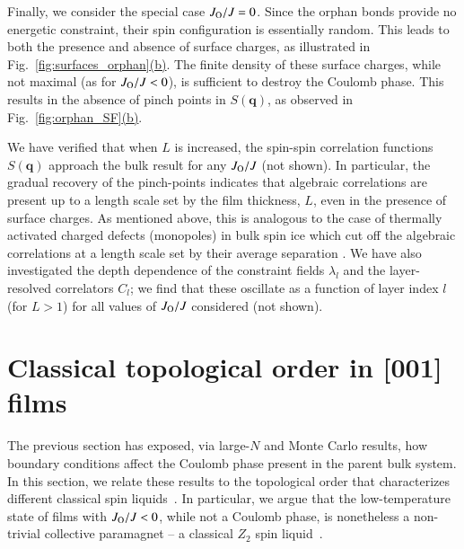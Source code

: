 \documentclass[aps,prx,reprint,runinaddress,superscriptaddress,amsmath,amssymb,floatfix,longbibliography]{revtex4-1}
\renewcommand{\vec}[1]{\boldsymbol{#1}}
\newcommand{\Jo}{J_{\rm O}}
\newcommand{\subref}[2]{\ref{#1}\hyperref[#1]{#2}}
\begin{document}
Finally, we consider the special case $\Jo/J = 0$. Since the orphan bonds provide no energetic constraint, their spin configuration is essentially random.  This leads to both the presence and absence of surface charges, as illustrated in Fig.~\subref{fig:surfaces_orphan}{(b)}. The finite density of these surface charges, while not maximal (as for $\Jo/J<0$), is sufficient to destroy the Coulomb phase. This results in the absence of pinch points in $S(\vec{q})$, as observed in Fig.~\subref{fig:orphan_SF}{(b)}.

We have verified that when $L$ is increased, the spin-spin correlation functions $S(\vec{q})$ approach the bulk result for any $\Jo/J$ (not shown). In particular, the gradual recovery of the pinch-points indicates that algebraic correlations are present up to a length scale set by the film thickness, $L$, even in the presence of surface charges. As mentioned above, this is analogous to the case of thermally activated charged defects (monopoles) in bulk spin ice which cut off the algebraic correlations at a length scale set by their average separation \cite{Castelnovo2011}. We have also investigated the depth dependence of the constraint fields $\lambda_l$ and the layer-resolved correlators $C_l$; we find that these oscillate as a function of layer index $l$ (for $L > 1$) for all values of $\Jo/J$ considered (not shown).

\section{Classical topological order in [001] films}
\label{sec:topological}

The previous section has exposed, via large-$N$ and Monte Carlo results, how boundary conditions affect the Coulomb phase present in the parent bulk system. In this section, we relate these results to the topological order that characterizes different classical spin liquids~\cite{Jaubert2013,Rehn2017}. In particular, we argue that the low-temperature state of films with $\Jo/J < 0$, while not a Coulomb phase, is nonetheless a non-trivial collective paramagnet -- a classical $Z_2$ spin liquid~\cite{Rehn2017}.
\end{document}
